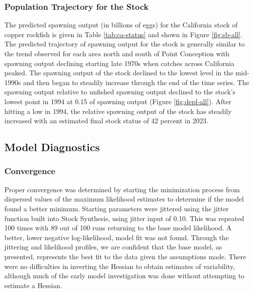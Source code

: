 \documentclass[11pt,
  english,
  letterpaper,
]{article}
\begin{document}
\hypertarget{population-trajectory-for-the-stock}{%
\subsubsection{Population Trajectory for the Stock}\label{population-trajectory-for-the-stock}}

The predicted spawning output (in billions of eggs) for the California stock of copper rockfish is given in Table \ref{tab:ca-status} and shown in Figure \ref{fig:sb-all}. The predicted trajectory of spawning output for the stock is generally similar to the trend observed for each area north and south of Point Conception with spawning output declining starting late 1970s when catches across California peaked. The spawning output of the stock declined to the lowest level in the mid-1990s and then began to steadily increase through the end of the time series. The spawning output relative to unfished spawning output declined to the stock's lowest point in 1994 at 0.15 of spawning output (Figure \ref{fig:depl-all}). After hitting a low in 1994, the relative spawning output of the stock has steadily increased with an estimated final stock status of 42 percent in 2023.

\hypertarget{model-diagnostics}{%
\subsection{Model Diagnostics}\label{model-diagnostics}}

\hypertarget{convergence}{%
\subsubsection{Convergence}\label{convergence}}

Proper convergence was determined by starting the minimization process from dispersed values of the maximum likelihood estimates to determine if the model found a better minimum. Starting parameters were jittered using the jitter function built into Stock Synthesis, using jitter input of 0.10. This was repeated 100 times with 89 out of 100 runs returning to the base model likelihood. A better, lower negative log-likelihood, model fit was not found. Through the jittering and likelihood profiles, we are confident that the base model, as presented, represents the best fit to the data given the assumptions made. There were no difficulties in inverting the Hessian to obtain estimates of variability, although much of the early model investigation was done without attempting to estimate a Hessian.
\end{document}
